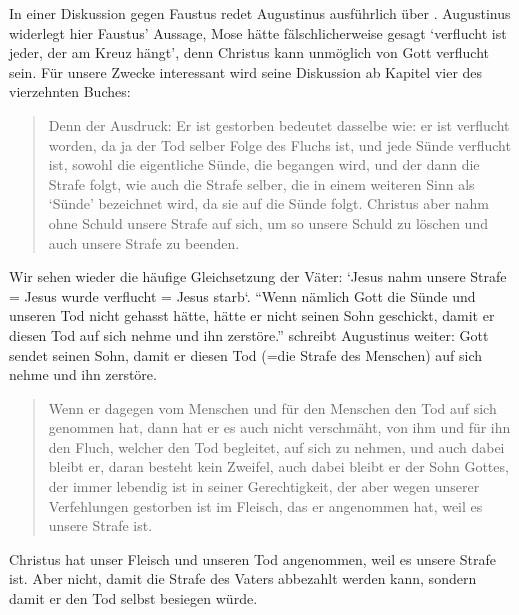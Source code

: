 In einer Diskussion gegen Faustus redet Augustinus ausführlich über .
Augustinus widerlegt hier Faustus' Aussage, Mose hätte fälschlicherweise gesagt `verflucht ist jeder, der am Kreuz hängt',
denn Christus kann unmöglich von Gott verflucht sein.
Für unsere Zwecke interessant wird seine Diskussion ab Kapitel vier des vierzehnten Buches:
\begin{quote}
	Denn der Ausdruck: Er ist gestorben bedeutet dasselbe wie:
	er ist verflucht worden, da ja der Tod selber Folge des Fluchs ist, und jede Sünde verflucht ist, sowohl die eigentliche Sünde,
	die begangen wird, und der dann die Strafe folgt, wie auch die Strafe selber, die in einem weiteren Sinn als ‘Sünde’ bezeichnet wird,
	da sie auf die Sünde folgt. Christus aber nahm ohne Schuld unsere Strafe auf sich, um so unsere Schuld zu löschen und auch unsere Strafe zu beenden.
\end{quote}
Wir sehen wieder die häufige Gleichsetzung der Väter: `Jesus nahm unsere Strafe = Jesus wurde verflucht = Jesus starb`.
``Wenn nämlich Gott die Sünde und unseren Tod nicht gehasst hätte, hätte er nicht seinen Sohn geschickt, damit er diesen Tod auf sich nehme und ihn zerstöre.'' \Cite[14.6]{contra-faustum} schreibt Augustinus weiter:
Gott sendet seinen Sohn, damit er diesen Tod (=die Strafe des Menschen) auf sich nehme und ihn zerstöre.
\begin{quote}
	Wenn er dagegen vom Menschen und für den Menschen den Tod auf sich genommen hat, dann hat er es auch nicht verschmäht,
	von ihm und für ihn den Fluch, welcher den Tod begleitet,
	auf sich zu nehmen, und auch dabei bleibt er, daran besteht kein Zweifel, auch dabei bleibt er der Sohn Gottes,
	der immer lebendig ist in seiner Gerechtigkeit, der aber wegen unserer Verfehlungen gestorben ist im Fleisch, das er angenommen hat,
	weil es unsere Strafe ist.
\end{quote}
Christus hat unser Fleisch und unseren Tod angenommen, weil es unsere Strafe ist.
Aber nicht, damit die Strafe des Vaters abbezahlt werden kann, sondern damit er den Tod selbst besiegen würde.


